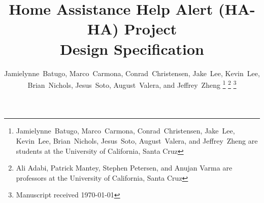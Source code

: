 \documentclass[journal]{IEEEtran}
\begin{document}
%
\title{
  Home Assistance Help Alert (HA-HA) Project \\
  Design Specification
}
%
%
%

\author{Jamielynne~Batugo, Marco~Carmona, Conrad~Christensen, Jake~Lee, Kevin~Lee, Brian~Nichols, Jesus~Soto, August~Valera, and Jeffrey~Zheng%
  \thanks{Jamielynne~Batugo, Marco~Carmona, Conrad~Christensen, Jake~Lee, Kevin~Lee, Brian~Nichols, Jesus~Soto, August~Valera, and Jeffrey~Zheng are students at the University of California, Santa Cruz}%
  \thanks{Ali Adabi, Patrick Mantey, Stephen Petersen, and Anujan Varma are professors at the University of California, Santa Cruz}%
\thanks{Manuscript received \today}}

%
%
\end{document}
